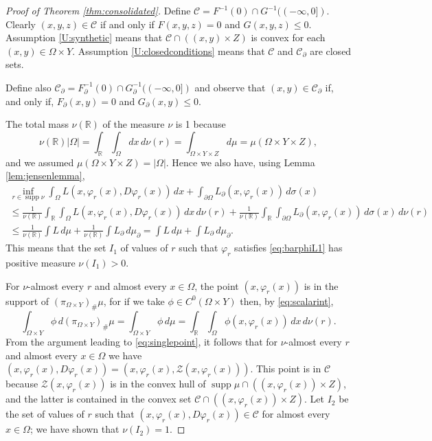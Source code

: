 \documentclass{article}
\newcommand{\R}{\mathbb{R}}
\theoremstyle{definition}
\theoremstyle{remark}
\newcommand{\proj}{\pi}
\newcommand{\projXY}{\proj_{\Omega\times Y}}
\begin{document}
\begin{proof}[Proof of Theorem \ref{thm:consolidated}]
%
Define $\mathcal C=F^{-1}(0)\cap G^{-1}((-\infty,0])$. Clearly $(x,y,z) \in \mathcal C$ if and only if $F(x,y,z) = 0$ and $G(x,y,z) \le 0$. %
Assumption \ref{U:synthetic} means that $\mathcal C\cap ((x,y)\times Z)$ is convex for each $(x,y)\in \Omega\times Y$. Assumption \ref{U:closedconditions} means that $\mathcal C$ and $\mathcal C_\partial$ are closed sets.

Define also $\mathcal C_\partial=F_\partial^{-1}(0)\cap G_\partial^{-1}((-\infty,0])$ and observe that $(x,y)\in\mathcal C_\partial$ if, and only if, $F_\partial(x,y) = 0$ and $G_\partial(x,y) \le 0$. 

The total mass $\nu(\R)$ of the measure $\nu$ is  1 because
\[\nu(\R)|\Omega|=\int_\R \int_\Omega dx\,d\nu(r)%
=\int_{\Omega\times Y\times Z}d\mu=\mu(\Omega\times Y\times Z),\]
and we assumed $\mu(\Omega\times Y\times Z)=|\Omega|$.
Hence we also have, using Lemma \ref{lem:jensenlemma},
\begin{multline}\label{eq:averagearg}
 \inf_{r\in\operatorname{supp}\nu}\int_\Omega L(x,\varphi_r(x),D\varphi_r(x))\,dx
 +\int_{\partial\Omega} L_\partial(x,\varphi_r(x))\,d\sigma(x)\\
 \leq\frac1{\nu({\R})}
 \int_\R \int_\Omega L(x,\varphi_r(x),D\varphi_r(x))\,dx\,d\nu(r)+\frac1{\nu({\R})}
 \int_\R \int_{\partial\Omega} L_\partial(x,\varphi_r(x))\,d\sigma(x)\,d\nu(r)\\
 \leq\frac1{\nu({\R})} \int L\,d\mu+\frac1{\nu({\R})}\int L_\partial\,d\mu_\partial=\int L\,d\mu+\int L_\partial\,d\mu_\partial.
\end{multline}
This means that the set $I_1$ of values of $r$ such that $\varphi_r$ satisfies \eqref{eq:barphiL1} has positive measure $\nu(I_1)>0$.

For $\nu$-almost every $r$ and almost every $x\in\Omega$, the point $(x,\varphi_r(x))$ is in the support of $(\projXY)_\#\mu$, for if we take $\phi\in C^0(\Omega\times Y)$ then, by \eqref{eq:scalarint},
\[\int_{\Omega\times Y}\phi\,d(\projXY)_\#\mu=\int_{\Omega\times Y}\phi\,d\mu=\int_\R\int_\Omega\phi(x,\varphi_r(x))\,dx\,d\nu(r).\]
From the argument leading to \eqref{eq:singlepoint}, it follows that for $\nu$-almost every $r$ and almost every $x\in\Omega$ we have $(x,\varphi_r(x),D\varphi_r(x))=(x,\varphi_r(x),\mathcal Z(x,\varphi_r(x)))$. This point is in $\mathcal C$ because $\mathcal Z(x,\varphi_r(x))$ is in the convex hull of $\operatorname{supp}\mu\cap ((x,\varphi_r(x))\times Z)$, and the latter is contained in the convex set $\mathcal C\cap ((x,\varphi_r(x))\times Z)$. Let $I_2$ be the set of values of $r$ such that $(x,\varphi_r(x),D\varphi_r(x))\in\mathcal C$ for almost every $x\in\Omega$; we have shown that $\nu(I_2)=1$.


\end{proof}
\end{document}
